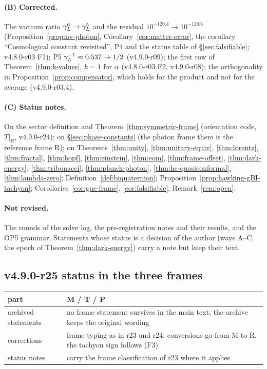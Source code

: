 \paragraph{(B) Corrected.}
The vacuum ratio \(\gamma_L^6\to\gamma_L^5\) and the residual \(10^{-120.4}\to10^{-120.6}\) (Proposition~\ref{prop:uv-photon},
Corollary~\ref{cor:matter-error}, the corollary ``Cosmological constant revisited'', P4 and the status table of
\S\ref{sec:falsifiable}; v4.8.0-r03 F1); P5 \(\gamma_L^{-1}\approx0.537\to1/2\) (v4.9.0-r09); the first row of
Theorem~\ref{thm:k-values}, \(k=1\) for \(\alpha\) (v4.8.0-r03 F2, v4.9.0-r08); the orthogonality in
Proposition~\ref{prop:compensator}, which holds for the product and not for the average (v4.9.0-r03.4).

\paragraph{(C) Status notes.}
On the sector definition and Theorem~\ref{thm:symmetric-frame} (orientation code, \(T|_R\), v4.9.0-r24); on
\S\ref{sec:phase-constants} (the photon frame there is the reference frame R); on Theorems~\ref{thm:unity},
\ref{thm:unitary-equiv}, \ref{thm:lorentz}, \ref{thm:fractal}, \ref{thm:hopf}, \ref{thm:einstein}, \ref{thm:eom},
\ref{thm:frame-offset}, \ref{thm:dark-energy}, \ref{thm:tribonacci}, \ref{thm:planck-photon}, \ref{thm:hc-quasiconformal},
\ref{thm:lambda-zero}; Definition~\ref{def:biquaternion}; Proposition~\ref{prop:hawking-gBI-tachyon};
Corollaries~\ref{cor:gue-frame}, \ref{cor:falsifiable}; Remark~\ref{rem:open}.

\paragraph{Not revised.}
The rounds of the solve log, the pre-registration notes and their results, and the OP5 grammar.  Statements whose status is a
decision of the author (ways A--C, the epoch of Theorem~\ref{thm:dark-energy}) carry a note but keep their text.

\subsection*{v4.9.0-r25 status in the three frames}
\label{subsec:v490-r25-frames}

\begin{center}
\small
\begin{tabular}{@{}>{\raggedright\arraybackslash}p{}>{\raggedright\arraybackslash}p{}@{}}
\toprule
part & M / T / P\\
\midrule
archived statements & no frame statement survives in the main text; the archive keeps the original wording\\
corrections & frame typing as in r23 and r24: conversions go from M to R, the tachyon sign follows (F3)\\
status notes & carry the frame classification of r23 where it applies\\
\bottomrule
\end{tabular}
\end{center}

